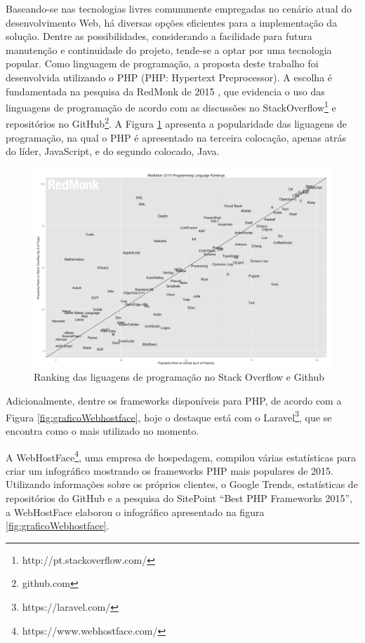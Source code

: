 

Baseando-se nas tecnologias livres comummente empregadas no cenário atual do desenvolvimento Web, há diversas opções eficientes para a implementação da solução. Dentre as possibilidades, considerando a facilidade para futura manutenção e continuidade do projeto, tende-se a optar por uma tecnologia popular. Como linguagem de programação, a proposta deste trabalho foi desenvolvida utilizando o PHP (PHP: Hypertext Preprocessor). A escolha é fundamentada na pesquisa da RedMonk de 2015 \cite{Grafico-RedMonk}, que evidencia o uso das linguagens de programação de acordo com as discussões no StackOverflow\footnote{http://pt.stackoverflow.com/} e repositórios no GitHub\footnote{github.com}. A Figura \ref{fig:graficoRedmonk} apresenta a popularidade das liguagens de programação, na qual o PHP é apresentado na terceira colocação, apenas atrás do líder, JavaScript, e do segundo colocado, Java.


\begin{figure}
	\includegraphics[width=1\textwidth]{images/grafico_redmonk}
	\caption{Ranking das liguagens de programação no Stack Overflow e Github}
    \label{fig:graficoRedmonk}
\end{figure}


Adicionalmente, dentre os frameworks disponíveis para PHP, de acordo com a Figura \ref{fig:graficoWebhostface}, hoje o destaque está com o Laravel\footnote{https://laravel.com/}, que se encontra como o mais utilizado no momento.
 

A WebHostFace\footnote{https://www.webhostface.com/}, uma empresa de hospedagem, compilou várias estatísticas para criar um infográfico mostrando os frameworks PHP mais populares de 2015. Utilizando informações sobre os próprios clientes, o Google Trends, estatísticas de repositórios do GitHub e a pesquisa do SitePoint “Best PHP Frameworks 2015”, a WebHostFace elaborou o infográfico apresentado na figura \ref{fig:graficoWebhostface}.


